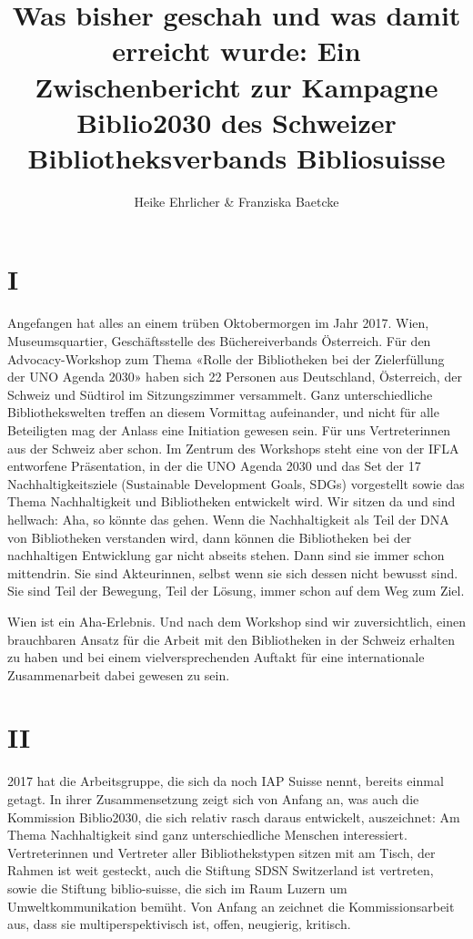 \documentclass[a4paper,
fontsize=11pt,
oneside,
numbers=noperiodatend,
parskip=half-,
bibliography=totoc,
final
]{scrartcl}
\title{\LARGE{Was bisher geschah und was damit erreicht wurde: Ein Zwischenbericht zur Kampagne Biblio2030 des Schweizer
Bibliotheksverbands Bibliosuisse}}%
\author{Heike Ehrlicher \& Franziska Baetcke} %
\date{}
\begin{document}
\maketitle
\thispagestyle{fancyplain} 


\hypertarget{i}{%
\section{I}\label{i}}

Angefangen hat alles an einem trüben Oktobermorgen im Jahr 2017. Wien,
Museumsquartier, Geschäftsstelle des Büchereiverbands Österreich. Für
den Advocacy-Workshop zum Thema «Rolle der Bibliotheken bei der
Zielerfüllung der UNO Agenda 2030» haben sich 22 Personen aus
Deutschland, Österreich, der Schweiz und Südtirol im Sitzungszimmer
versammelt. Ganz unterschiedliche Bibliothekswelten treffen an diesem
Vormittag aufeinander, und nicht für alle Beteiligten mag der Anlass
eine Initiation gewesen sein. Für uns Vertreterinnen aus der Schweiz
aber schon. Im Zentrum des Workshops steht eine von der IFLA entworfene
Präsentation, in der die UNO Agenda 2030 und das Set der 17
Nachhaltigkeitsziele (Sustainable Development Goals, SDGs) vorgestellt
sowie das Thema Nachhaltigkeit und Bibliotheken entwickelt wird. Wir
sitzen da und sind hellwach: Aha, so könnte das gehen. Wenn die
Nachhaltigkeit als Teil der DNA von Bibliotheken verstanden wird, dann
können die Bibliotheken bei der nachhaltigen Entwicklung gar nicht
abseits stehen. Dann sind sie immer schon mittendrin. Sie sind
Akteurinnen, selbst wenn sie sich dessen nicht bewusst sind. Sie sind
Teil der Bewegung, Teil der Lösung, immer schon auf dem Weg zum Ziel.

Wien ist ein Aha-Erlebnis. Und nach dem Workshop sind wir
zuversichtlich, einen brauchbaren Ansatz für die Arbeit mit den
Bibliotheken in der Schweiz erhalten zu haben und bei einem
vielversprechenden Auftakt für eine internationale Zusammenarbeit dabei
gewesen zu sein.

\hypertarget{ii}{%
\section{II}\label{ii}}

2017 hat die Arbeitsgruppe, die sich da noch IAP Suisse nennt, bereits
einmal getagt. In ihrer Zusammensetzung zeigt sich von Anfang an, was
auch die Kommission Biblio2030, die sich relativ rasch daraus
entwickelt, auszeichnet: Am Thema Nachhaltigkeit sind ganz
unterschiedliche Menschen interessiert. Vertreterinnen und Vertreter
aller Bibliothekstypen sitzen mit am Tisch, der Rahmen ist weit
gesteckt, auch die Stiftung SDSN Switzerland ist vertreten, sowie die
Stiftung biblio-suisse, die sich im Raum Luzern um Umweltkommunikation
bemüht. Von Anfang an zeichnet die Kommissionsarbeit aus, dass sie
multiperspektivisch ist, offen, neugierig, kritisch.
\end{document}
